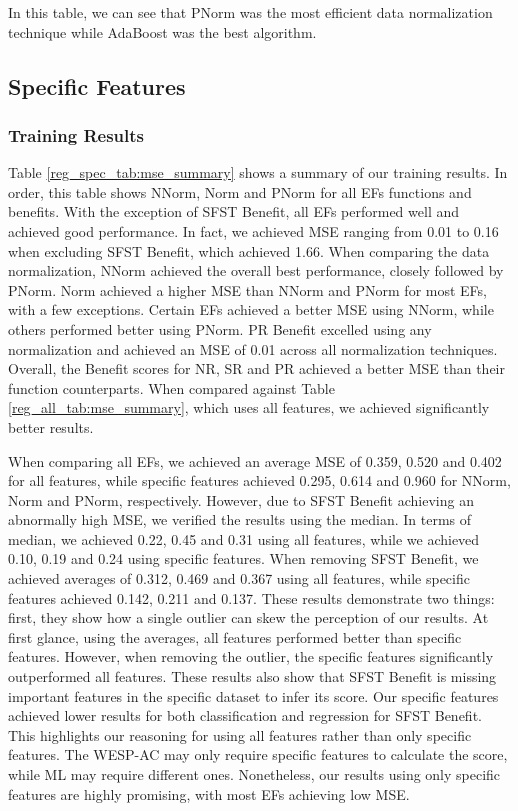 \documentclass[12pt,letterpaper]{article}
\begin{document}
In this table, we can see that \ac{PNorm} was the most efficient data normalization technique while AdaBoost was the best algorithm.






\subsection{Specific Features}
\subsubsection{Training Results}

Table \ref{reg_spec_tab:mse_summary} shows a summary of our training results.
In order, this table shows \ac{NNorm}, \ac{Norm} and \ac{PNorm} for all \ac{EF}s functions and benefits.
With the exception of \ac{SFST} Benefit, all \ac{EF}s performed well and achieved good performance.
In fact, we achieved MSE ranging from 0.01 to 0.16 when excluding \ac{SFST} Benefit, which achieved 1.66.
When comparing the data normalization, \ac{NNorm} achieved the overall best performance, closely followed by \ac{PNorm}.
\ac{Norm} achieved a higher MSE than \ac{NNorm} and \ac{PNorm} for most \ac{EF}s, with a few exceptions.
Certain \ac{EF}s achieved a better MSE using \ac{NNorm}, while others performed better using \ac{PNorm}.
\ac{PR} Benefit excelled using any normalization and achieved an MSE of 0.01 across all normalization techniques.
Overall, the Benefit scores for \ac{NR}, \ac{SR} and \ac{PR} achieved a better MSE than their function counterparts.
When compared against Table \ref{reg_all_tab:mse_summary}, which uses all features, we achieved significantly better results.

When comparing all \ac{EF}s, we achieved an average MSE of 0.359, 0.520 and 0.402 for all features, while specific features achieved 0.295, 0.614 and 0.960 for \ac{NNorm}, \ac{Norm} and \ac{PNorm}, respectively.
However, due to \ac{SFST} Benefit achieving an abnormally high MSE, we verified the results using the median.
In terms of median, we achieved 0.22, 0.45 and 0.31 using all features, while we achieved 0.10, 0.19 and 0.24 using specific features.
When removing \ac{SFST} Benefit, we achieved averages of 0.312, 0.469 and 0.367 using all features, while specific features achieved 0.142, 0.211 and 0.137.
These results demonstrate two things: first, they show how a single outlier can skew the perception of our results.
At first glance, using the averages, all features performed better than specific features.
However, when removing the outlier, the specific features significantly outperformed all features.
These results also show that \ac{SFST} Benefit is missing important features in the specific dataset to infer its score.
Our specific features achieved lower results for both classification and regression for \ac{SFST} Benefit.
This highlights our reasoning for using all features rather than only specific features.
The \ac{WESP-AC} may only require specific features to calculate the score, while \ac{ML} may require different ones.
Nonetheless, our results using only specific features are highly promising, with most \ac{EF}s achieving low MSE.
\end{document}
